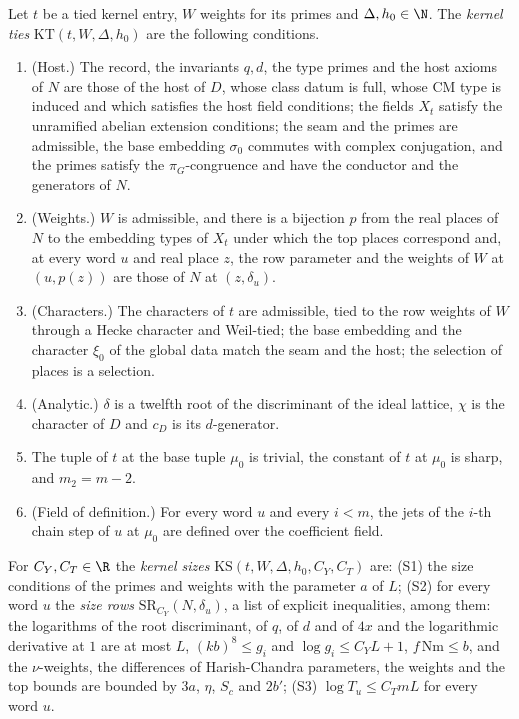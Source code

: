 \begin{definition}\label{pf:open0:def:kt}
Let $t$ be a tied kernel entry, $W$ weights for its primes and $\Delta,h_0\in\N$. The \emph{kernel ties}
$\mathrm{KT}(t,W,\Delta,h_0)$ are the following conditions.
\begin{enumerate}[label=(T\arabic*)]
\item\label{pf:open0:T1} (Host.) The record, the invariants $q,d$, the type primes and the host axioms of $N$ are those of
the host of $D$, whose class datum is full, whose CM type is induced and which satisfies the host field conditions; the fields
$X_t$ satisfy the unramified abelian extension conditions; the seam and the primes are admissible, the base embedding
$\sigma_0$ commutes with complex conjugation, and the primes satisfy the $\pi_G$-congruence and have the conductor and the
generators of $N$.
\item\label{pf:open0:T2} (Weights.) $W$ is admissible, and there is a bijection $p$ from the real places of $N$ to the
embedding types of $X_t$ under which the top places correspond and, at every word $u$ and real place $z$, the row parameter and
the weights of $W$ at $(u,p(z))$ are those of $N$ at $(z,\delta_u)$.
\item\label{pf:open0:T3} (Characters.) The characters of $t$ are admissible, tied to the row weights of $W$ through a Hecke
character and Weil-tied; the base embedding and the character $\xi_0$ of the global data match the seam and the host; the
selection of places is a selection.
\item\label{pf:open0:T4} (Analytic.) $\delta$ is a twelfth root of the discriminant of the ideal lattice, $\chi$ is the
character of $D$ and $c_D$ is its $d$-generator.
\item\label{pf:open0:T5} The tuple of $t$ at the base tuple $\mu_0$ is trivial, the constant of $t$ at $\mu_0$ is sharp, and
$m_2=m-2$.
\item\label{pf:open0:T6} (Field of definition.) For every word $u$ and every $i<m$, the jets of the $i$-th chain step of $u$
at $\mu_0$ are defined over the coefficient field.
\end{enumerate}
For $C_Y,C_T\in\R$ the \emph{kernel sizes} $\mathrm{KS}(t,W,\Delta,h_0,C_Y,C_T)$ are: (S1) the size conditions of the primes and
weights with the parameter $a$ of $L$; (S2) for every word $u$ the \emph{size rows} $\mathrm{SR}_{C_Y}(N,\delta_u)$, a list of
explicit inequalities, among them: the logarithms of the root discriminant, of $q$, of $d$ and of $4x$ and the logarithmic
derivative at $1$ are at most $L$, $(kb)^8\le g_i$ and $\log g_i\le C_YL+1$, $f\,\mathrm{Nm}\le b$, and the $\nu$-weights, the
differences of Harish-Chandra parameters, the weights and the top bounds are bounded by $3a$, $\eta$, $S_c$ and $2b'$; (S3)
$\log T_u\le C_TmL$ for every word $u$.
\ \ 
\end{definition}

